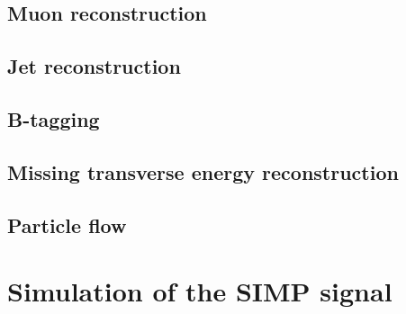 \subsection{Muon reconstruction}
\label{sec:muon_reconstruction}

\subsection{Jet reconstruction}
\label{sec:jet_reconstruction}

\subsection{B-tagging}

\subsection{Missing transverse energy reconstruction}

\subsection{Particle flow}

\section{Simulation of the SIMP signal}


\clearpage
%
%

\clearpage{\pagestyle{empty}\cleardoublepage}
